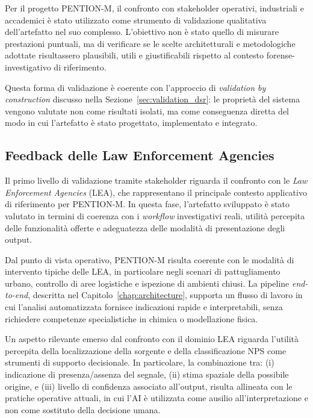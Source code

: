 Per il progetto \textsc{PENTION-M}, il confronto con stakeholder operativi, industriali e accademici è stato utilizzato come strumento di validazione qualitativa dell’artefatto nel suo complesso.
L’obiettivo non è stato quello di misurare prestazioni puntuali, ma di verificare se le scelte architetturali e metodologiche adottate risultassero plausibili, utili e giustificabili rispetto al contesto forense-investigativo di riferimento.

Questa forma di validazione è coerente con l’approccio di \emph{validation by construction} discusso nella Sezione~\ref{sec:validation_dsr}: le proprietà del sistema vengono valutate non come risultati isolati, ma come conseguenza diretta del modo in cui l’artefatto è stato progettato, implementato e integrato.

\subsection{Feedback delle Law Enforcement Agencies}
\label{subsec:validation_lea}

Il primo livello di validazione tramite stakeholder riguarda il confronto con le \emph{Law Enforcement Agencies} (LEA), che rappresentano il principale contesto applicativo di riferimento per PENTION-M.
In questa fase, l’artefatto sviluppato è stato valutato in termini di coerenza con i \textit{workflow} investigativi reali, utilità percepita delle funzionalità offerte e adeguatezza delle modalità di presentazione degli output.

Dal punto di vista operativo, PENTION-M risulta coerente con le modalità di intervento tipiche delle LEA, in particolare negli scenari di pattugliamento urbano, controllo di aree logistiche e ispezione di ambienti chiusi.
La pipeline \textit{end-to-end}, descritta nel Capitolo~\ref{chap:architecture}, supporta un flusso di lavoro in cui l’analisi automatizzata fornisce indicazioni rapide e interpretabili, senza richiedere competenze specialistiche in chimica o modellazione fisica.

Un aspetto rilevante emerso dal confronto con il dominio LEA riguarda l’utilità percepita della localizzazione della sorgente e della classificazione NPS come strumenti di supporto decisionale.
In particolare, la combinazione tra:
(i) indicazione di presenza/assenza del segnale,
(ii) stima spaziale della possibile origine,
e (iii) livello di confidenza associato all’output,
risulta allineata con le pratiche operative attuali, in cui l’AI è utilizzata come ausilio all’interpretazione e non come sostituto della decisione umana.

